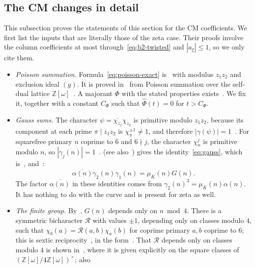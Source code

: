 \documentclass[11pt]{article}
\numberwithin{equation}{section}
\newcommand{\OO}{\mathbb Z[\omega]}
\newcommand{\muk}{\mu_K}
\begin{document}
\subsection{The CM changes in detail}\label{subsec:b2-cm}
This subsection proves the statements of this section for the CM coefficients. We first
list the inputs that are literally those of the zeta case. Their proofs involve the column
coefficients at most through~\eqref{eq:b2-twisted} and $|a_\xi|\le1$, so we only cite them.
\begin{itemize}
\item \emph{Poisson summation.} Formula~\eqref{eq:poisson-exact} is~\cite[Lemma~4.2]{OAI1112}
 with modulus $z_1z_2$ and exclusion ideal $(g)$. It is proved in~\cite[Lemma~21]{QF}
 from Poisson summation over the self-dual lattice $\OO$~\cite[Proposition~16 and
 Theorem~19]{QF}. A majorant $\Phi$ with the stated properties exists~\cite[end of
 Section~4.3]{QF}. We fix it, together with a constant $C_\Phi$ such that
 $\widehat\Phi(t)=0$ for $t>C_\Phi$.
\item \emph{Gauss sums.} The character $\psi=\overline{\chi_{z_1}}\chi_{z_2}$ is primitive
 modulo $z_1z_2$, because its component at each prime $\pi\mid z_1z_2$ is
 $\chi_\pi^{\pm1}\ne1$, and therefore $|\gamma(\psi)|=1$~\cite[Lemma~17 and
 Section~4.5]{QF}. For squarefree primary $n$ coprime to $6$ and $6\nmid j$, the character
 $\chi_n^j$ is primitive modulo $n$, so $|\gamma_j(n)|=1$~\cite[Lemma~17]{QF}.
 \cite[Lemma~4.1]{OAI1112} (see also~\cite[Proposition~18]{QF}) gives the
 identity~\eqref{eq:gauss}, which is~\cite[(4.5)]{OAI1112}, and~\cite[(4.4)]{OAI1112}:
 \begin{equation}\label{eq:b2-g1g2}
  \overline{\alpha(n)}\gamma_2(n)\gamma_1(n)=\muk(n)G(n).
 \end{equation}
 The factor $\overline{\alpha(n)}$ in these identities comes from
 $\gamma_2(n)^3=\muk(n)\alpha(n)$. It has nothing to do with the curve and is present for
 zeta as well.
\item \emph{The finite group.} By~\cite[Appendix~A.1]{OAI1112}, $G(n)$ depends only on
 $n\bmod4$. There is a symmetric bicharacter $\mathcal R$ with values $\pm1$, depending
 only on classes modulo $4$, such that $\chi_b(a)=\mathcal R(a,b)\chi_a(b)$ for coprime
 primary $a,b$ coprime to $6$; this is sextic reciprocity~\cite[\S7.3]{Lemmermeyer}, in the form~\cite[(4.1)]{OAI1112}. That
 $\mathcal R$ depends only on classes modulo $4$ is shown in~\cite[Appendix~A.1]{OAI1112},
 where it is given explicitly on the square classes of $(\OO/4\OO)^\times$; also

\end{itemize}
\end{document}
